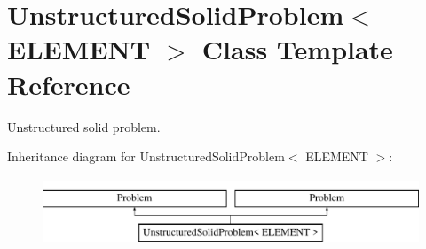 \hypertarget{classUnstructuredSolidProblem}{}\section{Unstructured\+Solid\+Problem$<$ E\+L\+E\+M\+E\+NT $>$ Class Template Reference}
\label{classUnstructuredSolidProblem}


Unstructured solid problem.  


Inheritance diagram for Unstructured\+Solid\+Problem$<$ E\+L\+E\+M\+E\+NT $>$\+:\begin{figure}[H]
\begin{center}
\leavevmode
\includegraphics[height=2.000000cm]{classUnstructuredSolidProblem}
\end{center}
\end{figure}
